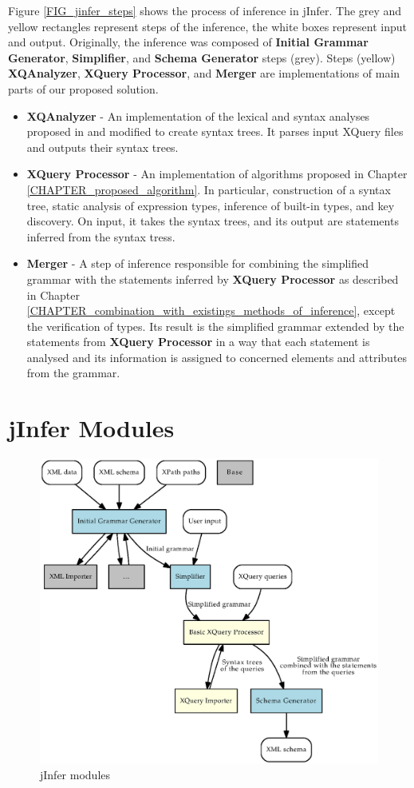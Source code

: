 Figure \ref{FIG_jinfer_steps} shows the process of inference in jInfer. The grey and yellow rectangles represent steps of the inference, the white boxes represent input and output. Originally, the inference was composed of \textbf{Initial Grammar Generator}, \textbf{Simplifier}, and \textbf{Schema Generator} steps (grey). Steps (yellow) \textbf{XQAnalyzer}, \textbf{XQuery Processor}, and \textbf{Merger} are implementations of main parts of our proposed solution.

\begin{itemize}
\item \textbf{XQAnalyzer} - An implementation of the lexical and syntax analyses proposed in \cite{thesis_schejbal} and modified to create syntax trees. It parses input XQuery files and outputs their syntax trees.
\item \textbf{XQuery Processor} - An implementation of algorithms proposed in Chapter \ref{CHAPTER_proposed_algorithm}. In particular, construction of a syntax tree, static analysis of expression types, inference of built-in types, and key discovery. On input, it takes the syntax trees, and its output are statements inferred from the syntax tress. 
\item \textbf{Merger} - A step of inference responsible for combining the simplified grammar with the statements inferred by \textbf{XQuery Processor} as described in Chapter \ref{CHAPTER_combination_with_existings_methods_of_inference}, except the verification of types. Its result is the simplified grammar extended by the statements from \textbf{XQuery Processor} in a way that each statement is analysed and its information is assigned to concerned elements and attributes from the grammar. 
\end{itemize}

\section{jInfer Modules}
\begin{figure}
\includegraphics[scale=0.8]{jinfer_modules.eps}
\caption{jInfer modules}
\label{FIG_jinfer_modules}
\end{figure}

